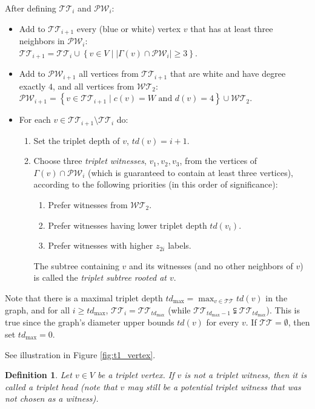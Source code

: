 \documentclass[11pt]{article}
\def\dnsitem{\vspace{-7pt}\item}
\def\dnssubitem{\vspace{-5pt}\item}
\newtheorem{definition}[theorem]{Definition}
\theoremstyle{definition}
\begin{document}
\bigskip
\par\noindent
After defining $\mathcal{TT}_i$ and $\mathcal{PW}_i$:
\begin{itemize}
	\dnsitem Add to $\mathcal{TT}_{i+1}$ every (blue or white) vertex $v$ that has at least three neighbors in $\mathcal{PW}_i$: \\
	${\mathcal{TT}_{i+1} = \mathcal{TT}_i \cup \left\{ v \in V \mid \left|\Gamma(v) \cap \mathcal{PW}_i \right| \geq 3 \right\}}$.
			
	\dnsitem Add to $\mathcal{PW}_{i+1}$ all vertices from $\mathcal{TT}_{i+1}$ that are white and have degree exactly $4$, and all vertices from $\mathcal{WT}_2$: \\
	${\mathcal{PW}_{i+1} = \left\{v \in \mathcal{TT}_{i+1} \mid c(v) = W \text{ and } d(v) = 4 \right\} \cup \mathcal{WT}_2}$.

	\dnsitem
	For each $v \in \mathcal{TT}_{i+1} \setminus \mathcal{TT}_i$ do:
	\begin{enumerate}
		\dnsitem Set the triplet depth of $v$, $td(v) = i + 1$.
		\dnssubitem Choose three \emph{triplet witnesses}, $v_1, v_2, v_3$, from the vertices of ${\Gamma(v) \cap \mathcal{PW}_i}$ (which is guaranteed to contain at least three vertices),
		according to the following priorities (in this order of significance):
		\begin{enumerate}
			\dnssubitem Prefer witnesses from $\mathcal{WT}_2$.
			\dnssubitem Prefer witnesses having lower triplet depth $td(v_i)$.
			\dnssubitem Prefer witnesses with higher $z_{2i}$ labels.
		\end{enumerate}

		The subtree containing $v$ and its witnesses (and no other neighbors of $v$) is called the \emph{triplet subtree rooted at $v$}.
	\end{enumerate}

\end{itemize}
Note that there is a maximal triplet depth $td_{\max} = \max_{v \in \mathcal{TT}} {td(v)}$ in the graph, and for all $i \geq td_{\max}$, ${\mathcal{TT}_i = \mathcal{TT}_{td_{\max}}}$ (while $\mathcal{TT}_{td_{\max} - 1} \subsetneqq \mathcal{TT}_{td_{\max}}$).
This is true since the graph's diameter upper bounds $td(v)$ for every $v$.
If $\mathcal{TT} = \emptyset$, then set $td_{\max} = 0$.

See illustration in Figure \ref{fig:t1_vertex}.

\begin{definition}
Let $v \in V$ be a triplet vertex.
If $v$ is not a triplet witness, then it is called a \emph{triplet head}
(note that $v$ may still be a potential triplet witness that was not chosen as a witness).
\end{definition}
\end{document}
